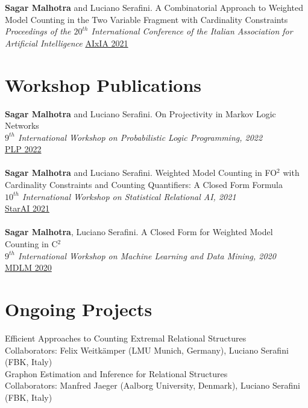 \documentclass[10pt, a4paper]{article}
\newcommand{\years}[1]{\marginnote{\scriptsize #1}}
\begin{document}
\years{2021}\textbf{Sagar Malhotra} and Luciano Serafini. A Combinatorial Approach to Weighted Model Counting in the Two Variable Fragment with Cardinality Constraints\\ \emph{ Proceedings of the $20^{th}$ International Conference of the Italian Association for Artificial Intelligence}
\href{https://link.springer.com/chapter/10.1007/978-3-031-08421-8_10}{AIxIA 2021}


\section*{Workshop Publications}
\noindent
\years{2022}\textbf{Sagar Malhotra} and Luciano Serafini. On Projectivity in Markov Logic Networks\\ \emph{$9^{th}$ International Workshop on Probabilistic Logic Programming, 2022}\\ 
\href{https://easychair.org/publications/preprint/2lTk}{PLP 2022}\\ \\ 
\years{2021}\textbf{Sagar Malhotra} and Luciano Serafini. Weighted Model Counting in FO$^2$ with Cardinality Constraints and Counting Quantifiers: A Closed Form Formula\\ \emph{$10^{th}$ International Workshop on Statistical Relational AI, 2021}\\
\href{https://starai.cs.kuleuven.be/2021/}{StarAI 2021} \\ \\ 
\years{{2020}}\textbf{Sagar Malhotra}, Luciano Serafini. A Closed Form for Weighted Model Counting in C$^2$ \\
\emph{$9^{th}$ International Workshop on Machine Learning and Data Mining, 2020}\\ 
\href{https://sites.google.com/view/mldm2020-workshop/program?authuser=0}{MDLM 2020}



\section*{Ongoing Projects}
\noindent

Efficient Approaches to Counting Extremal Relational Structures\\
Collaborators: Felix Weitkämper (LMU Munich, Germany), Luciano Serafini (FBK, Italy)\\ 

Graphon Estimation and Inference for Relational Structures\\
Collaborators: Manfred Jaeger (Aalborg University, Denmark), Luciano Serafini (FBK, Italy) 
\end{document}
